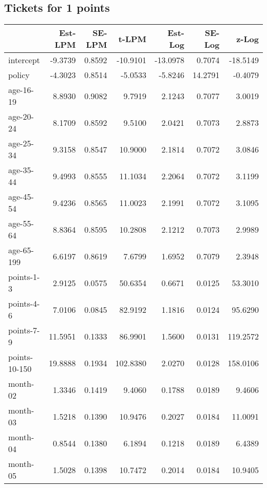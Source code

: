 \documentclass[10pt]{article}
\begin{document}

\subsection{Tickets for 1 points}




\begin{table}[ht]
\centering
\begin{tabular}{lrrrrrr}
  \hline
 & Est-LPM & SE-LPM & t-LPM & Est-Log & SE-Log & z-Log \\ 
  \hline
intercept & -9.3739 & 0.8592 & -10.9101 & -13.0978 & 0.7074 & -18.5149 \\ 
  policy & -4.3023 & 0.8514 & -5.0533 & -5.8246 & 14.2791 & -0.4079 \\ 
  age-16-19 & 8.8930 & 0.9082 & 9.7919 & 2.1243 & 0.7077 & 3.0019 \\ 
  age-20-24 & 8.1709 & 0.8592 & 9.5100 & 2.0421 & 0.7073 & 2.8873 \\ 
  age-25-34 & 9.3158 & 0.8547 & 10.9000 & 2.1814 & 0.7072 & 3.0846 \\ 
  age-35-44 & 9.4993 & 0.8555 & 11.1034 & 2.2064 & 0.7072 & 3.1199 \\ 
  age-45-54 & 9.4236 & 0.8565 & 11.0023 & 2.1991 & 0.7072 & 3.1095 \\ 
  age-55-64 & 8.8364 & 0.8595 & 10.2808 & 2.1212 & 0.7073 & 2.9989 \\ 
  age-65-199 & 6.6197 & 0.8619 & 7.6799 & 1.6952 & 0.7079 & 2.3948 \\ 
  points-1-3 & 2.9125 & 0.0575 & 50.6354 & 0.6671 & 0.0125 & 53.3010 \\ 
  points-4-6 & 7.0106 & 0.0845 & 82.9192 & 1.1816 & 0.0124 & 95.6290 \\ 
  points-7-9 & 11.5951 & 0.1333 & 86.9901 & 1.5600 & 0.0131 & 119.2572 \\ 
  points-10-150 & 19.8888 & 0.1934 & 102.8380 & 2.0270 & 0.0128 & 158.0106 \\ 
  month-02 & 1.3346 & 0.1419 & 9.4060 & 0.1788 & 0.0189 & 9.4606 \\ 
  month-03 & 1.5218 & 0.1390 & 10.9476 & 0.2027 & 0.0184 & 11.0091 \\ 
  month-04 & 0.8544 & 0.1380 & 6.1894 & 0.1218 & 0.0189 & 6.4389 \\ 
  month-05 & 1.5028 & 0.1398 & 10.7472 & 0.2014 & 0.0184 & 10.9405 \\ 

\end{tabular}
\end{table}
\end{document}
